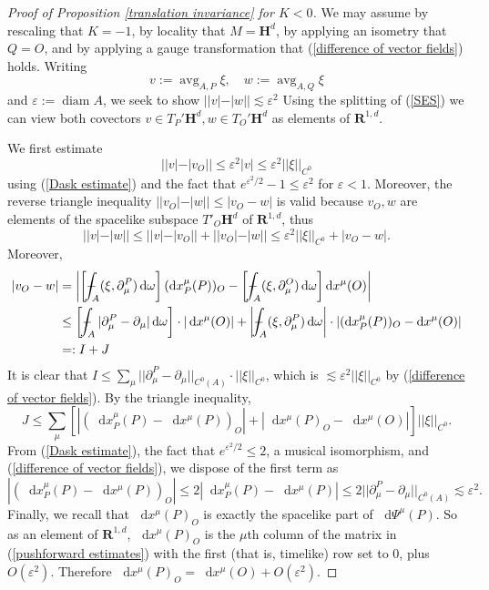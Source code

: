 \documentclass[reqno,11pt]{amsart}
\newcommand{\RR}{\mathbf{R}}
\newcommand{\Hyp}{\mathbf H}
\DeclareMathOperator{\avg}{avg}
\DeclareMathOperator{\diam}{diam}
\newcommand*\dif{\mathop{}\!\mathrm{d}}
\theoremstyle{definition}
\numberwithin{equation}{section}
\def\Xint#1{\mathchoice
{\XXint\displaystyle\textstyle{#1}}%
{\XXint\textstyle\scriptstyle{#1}}%
{\XXint\scriptstyle\scriptscriptstyle{#1}}%
{\XXint\scriptscriptstyle\scriptscriptstyle{#1}}%
\!\int}
\def\XXint#1#2#3{{\setbox0=\hbox{$#1{#2#3}{\int}$ }
\vcenter{\hbox{$#2#3$ }}\kern-.6\wd0}}
\def\dashint{\Xint-}
\begin{document}
\begin{proof}[Proof of Proposition \ref{translation invariance} for $K < 0$]
We may assume by rescaling that $K = -1$, by locality that $M = \Hyp^d$, by applying an isometry that $Q = O$, and by applying a gauge transformation that (\ref{difference of vector fields}) holds.
Writing
$$v := \avg_{A, P} \xi, \quad w := \avg_{A, Q} \xi$$
and $\varepsilon := \diam A$, we seek to show $||v| - |w|| \lesssim \varepsilon^2$
Using the splitting of (\ref{SES}) we can view both covectors $v \in T_P' \Hyp^d, w \in T_O' \Hyp^d$ as elements of $\RR^{1, d}$.

We first estimate
$$||v| - |v_O|| \leq \varepsilon^2 |v| \leq \varepsilon^2 ||\xi||_{C^0}$$
using (\ref{Dask estimate}) and the fact that $e^{\varepsilon^2/2} - 1 \leq \varepsilon^2$ for $\varepsilon < 1$.
Moreover, the reverse triangle inequality $||v_O| - |w|| \leq |v_O - w|$ is valid because $v_O, w$ are elements of the spacelike subspace $T'_O \Hyp^d$ of $\RR^{1, d}$, thus
$$||v| - |w|| \leq ||v| - |v_O|| + ||v_O| - |w|| \leq \varepsilon^2 ||\xi||_{C^0} + |v_O - w|.$$
Moreover,
\begin{align*}
|v_O - w| &= \left|\left[\dashint_A (\xi, \partial^P_\mu) \dif \omega\right] (\dif x_P^\mu(P))_O - \left[\dashint_A (\xi, \partial^O_\mu) \dif \omega\right] \dif x^\mu(O)\right| \\
&\leq \left[\dashint_A |\partial^P_\mu - \partial_\mu| \dif \omega\right] \cdot |\dif x^\mu(O)| + \left|\dashint_A (\xi, \partial_\mu^P) \dif \omega\right| \cdot |(\dif x^\mu_P(P))_O - \dif x^\mu(O)|\\
&=: I + J
\end{align*}
It is clear that $I \leq \sum_\mu ||\partial^P_\mu - \partial_\mu||_{C^0(A)} \cdot ||\xi||_{C^0}$, which is $\lesssim \varepsilon^2 ||\xi||_{C^0}$ by (\ref{difference of vector fields}).
By the triangle inequality,
$$J \leq \sum_\mu \left[|(\dif x^\mu_P(P) - \dif x^\mu(P))_O| + |\dif x^\mu(P)_O - \dif x^\mu(O)|\right] ||\xi||_{C^0}.$$
From (\ref{Dask estimate}), the fact that $e^{\varepsilon^2/2} \leq 2$, a musical isomorphism, and (\ref{difference of vector fields}), we dispose of the first term as
$$|(\dif x^\mu_P(P) - \dif x^\mu(P))_O| \leq 2 |\dif x^\mu_P(P) - \dif x^\mu(P)| \leq 2 ||\partial^P_\mu - \partial_\mu||_{C^0(A)} \lesssim \varepsilon^2.$$
Finally, we recall that $\dif x^\mu(P)_O$ is exactly the spacelike part of $\dif \Psi^\mu(P)$.
So as an element of $\RR^{1, d}$, $\dif x^\mu(P)_O$ is the $\mu$th column of the matrix in (\ref{pushforward estimates}) with the first (that is, timelike) row set to $0$, plus $O(\varepsilon^2)$.
Therefore $\dif x^\mu(P)_O = \dif x^\mu(O) + O(\varepsilon^2)$.
\end{proof}
\end{document}
